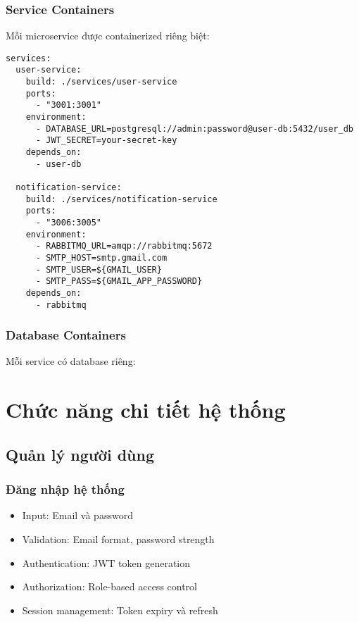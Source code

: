 \documentclass[12pt,a4paper]{report}
\begin{document}
\subsection{Service Containers}
Mỗi microservice được containerized riêng biệt:

\begin{lstlisting}[language=text, caption=docker-compose.yml excerpt]
services:
  user-service:
    build: ./services/user-service
    ports:
      - "3001:3001"
    environment:
      - DATABASE_URL=postgresql://admin:password@user-db:5432/user_db
      - JWT_SECRET=your-secret-key
    depends_on:
      - user-db
      
  notification-service:
    build: ./services/notification-service
    ports:
      - "3006:3005"
    environment:
      - RABBITMQ_URL=amqp://rabbitmq:5672
      - SMTP_HOST=smtp.gmail.com
      - SMTP_USER=${GMAIL_USER}
      - SMTP_PASS=${GMAIL_APP_PASSWORD}
    depends_on:
      - rabbitmq
\end{lstlisting}

\subsection{Database Containers}
Mỗi service có database riêng:


\chapter{Chức năng chi tiết hệ thống}

\section{Quản lý người dùng}

\subsection{Đăng nhập hệ thống}
\begin{itemize}
    \item Input: Email và password
    \item Validation: Email format, password strength
    \item Authentication: JWT token generation
    \item Authorization: Role-based access control
    \item Session management: Token expiry và refresh
\end{itemize}
\end{document}
